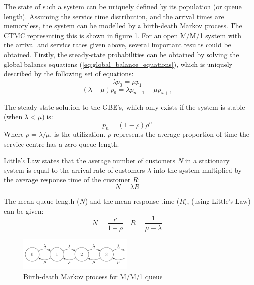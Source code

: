 The state of such a system can be uniquely defined by its population (or queue length). Assuming the service time distribution, and the arrival times are memoryless, the system can be modelled by a birth-death Markov process. The CTMC representing this is shown in figure \ref{fig:MM1_BDP}. For an open M/M/1 system with the arrival and service rates given above, several important results could be obtained. Firstly, the steady-state probabilities can be obtained by solving the global balance equations (\ref{eq:global_balance_equations}), which is uniquely described by the following set of equations:
\[ \lambda p_0 = \mu p_1\]
\[ (\lambda + \mu) p_0 = \lambda p_{n-1} + \mu p_{n+1}\]

The steady-state solution to the GBE's, which only exists if the system is stable (when \(\lambda < \mu\)) is:
\[p_n = (1-\rho) \rho^n\]
Where \(\rho = \lambda/\mu\), is the utilization. \(\rho\) represents the average proportion of time the service centre has a zero queue length.

\begin{theorem}
    Little's Law states that the average number of customers \(N\) in a stationary system is equal to the arrival rate of customers \(\lambda\) into the system multiplied by the average response time of the customer \(R\):
    \begin{equation}
        N = \lambda R
    \end{equation}
\end{theorem}

The mean queue length (\(N\)) and the mean response time (\(R\)), (using Little's Law) can be given:
\[N = \frac{\rho}{1-\rho} \quad R = \frac{1}{\mu - \lambda}\]

\begin{figure}[H]
\begin{center}
\includegraphics[width=0.5\textwidth]{Chap2_AlgorithmsPFQN/MM1_BDP.png}
\caption{Birth-death Markov process for M/M/1 queue}
\label{fig:MM1_BDP}
\end{center}
\end{figure}

